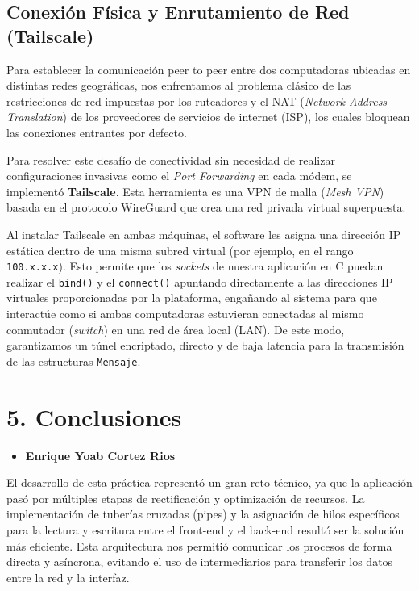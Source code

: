 \documentclass[12pt]{article}
\begin{document}
\subsection{\large Conexión Física y Enrutamiento de Red (Tailscale)}
Para establecer la comunicación peer to peer entre dos computadoras ubicadas en distintas redes geográficas, nos enfrentamos al problema clásico de las restricciones de red impuestas por los ruteadores y el NAT (\textit{Network Address Translation}) de los proveedores de servicios de internet (ISP), los cuales bloquean las conexiones entrantes por defecto.

Para resolver este desafío de conectividad sin necesidad de realizar configuraciones invasivas como el \textit{Port Forwarding} en cada módem, se implementó \textbf{Tailscale}. Esta herramienta es una VPN de malla (\textit{Mesh VPN}) basada en el protocolo WireGuard que crea una red privada virtual superpuesta. 

Al instalar Tailscale en ambas máquinas, el software les asigna una dirección IP estática dentro de una misma subred virtual (por ejemplo, en el rango \texttt{100.x.x.x}). Esto permite que los \textit{sockets} de nuestra aplicación en C puedan realizar el \texttt{bind()} y el \texttt{connect()} apuntando directamente a las direcciones IP virtuales proporcionadas por la plataforma, engañando al sistema para que interactúe como si ambas computadoras estuvieran conectadas al mismo conmutador (\textit{switch}) en una red de área local (LAN). De este modo, garantizamos un túnel encriptado, directo y de baja latencia para la transmisión de las estructuras \texttt{Mensaje}.

\section{\large 5. Conclusiones}
\begin{itemize}
    \item \textbf{Enrique Yoab Cortez Rios}
\end{itemize}
El desarrollo de esta práctica representó un gran reto técnico, ya que la aplicación pasó por múltiples etapas de rectificación y optimización de recursos. La implementación de tuberías cruzadas (pipes) y la asignación de hilos específicos para la lectura y escritura entre el front-end y el back-end resultó ser la solución más eficiente. Esta arquitectura nos permitió comunicar los procesos de forma directa y asíncrona, evitando el uso de intermediarios para transferir los datos entre la red y la interfaz.
\end{document}
